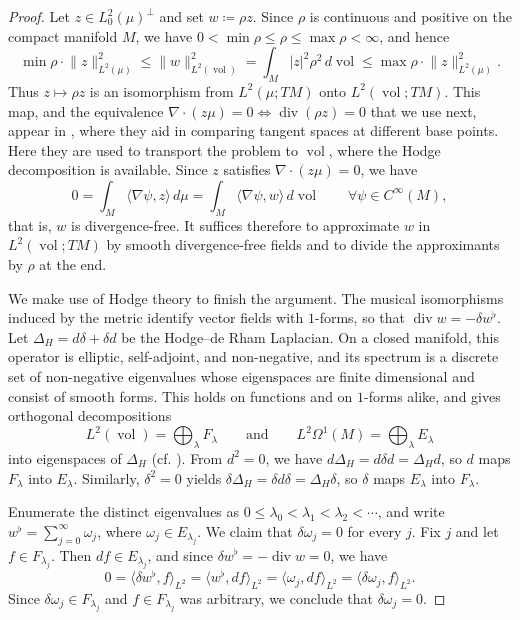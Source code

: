 \documentclass[11pt,reqno]{amsart}
\theoremstyle{plain}
\theoremstyle{definition}
\DeclareMathOperator{\vol}{vol}
\DeclareMathOperator{\Div}{div}
\begin{document}
\begin{proof}
    Let \( z\in L^2_0(\mu)^\perp \) and set \( w\coloneqq\rho z \).
    Since \( \rho \) is continuous and positive on the compact manifold \( M \), we have \( 0<\min\rho\le\rho\le\max\rho<\infty \), and hence
    \[
        \min\rho\cdot\lVert z\rVert^2_{L^2(\mu)} \le \lVert w\rVert^2_{L^2(\vol)} =\int_M\lvert z\rvert^2\rho^2\,d\vol \le \max\rho\cdot\lVert z\rVert^2_{L^2(\mu)}.
    \]
    Thus \( z\mapsto\rho z \) is an isomorphism from \( L^2(\mu;TM) \) onto \( L^2(\vol;TM) \).
    This map, and the equivalence \( \nabla\!\cdot(z\mu)=0\iff\Div(\rho z)=0 \) that we use next, appear in \cite[\S3]{gomes_differential_2024}, where they aid in comparing tangent spaces at different base points.
    Here they are used to transport the problem to \( \vol \), where the Hodge decomposition is available.
    Since \( z \) satisfies \( \nabla\!\cdot(z\mu)=0 \), we have
    \[
        0
        =\int_M\langle\nabla\psi,z\rangle\,d\mu =\int_M\langle\nabla\psi,w\rangle\,d\vol \qquad\forall\psi\in C^\infty(M),
    \]
    that is, \( w \) is divergence-free.
    It suffices therefore to approximate \( w \) in \( L^2(\vol;TM) \) by smooth divergence-free fields and to divide the approximants by \( \rho \) at the end.

    We make use of Hodge theory to finish the argument.
    The musical isomorphisms induced by the metric identify vector fields with \( 1 \)-forms, so that \( \Div w=-\delta w^\flat \).
    Let \( \Delta_H=d\delta+\delta d \) be the Hodge--de Rham Laplacian.
    On a closed manifold, this operator is elliptic, self-adjoint, and non-negative, and its spectrum is a discrete set of non-negative eigenvalues whose eigenspaces are finite dimensional and consist of smooth forms.
    This holds on functions and on \( 1 \)-forms alike, and gives orthogonal decompositions
    \[
        L^2(\vol)=\bigoplus_\lambda F_\lambda \qquad\text{and}\qquad L^2\Omega^1(M)=\bigoplus_\lambda E_\lambda
    \]
    into eigenspaces of \( \Delta_H \) (cf. \cite[Chapter 6]{warner_foundations_1983}).
    From \( d^2=0 \), we have \( d\Delta_H=d\delta d=\Delta_Hd \), so \( d \) maps \( F_\lambda \) into \( E_\lambda \).
    Similarly, \( \delta^2=0 \) yields \( \delta\Delta_H=\delta d\delta=\Delta_H\delta \), so \( \delta \) maps \( E_\lambda \) into \( F_\lambda \).

    Enumerate the distinct eigenvalues as \( 0\le\lambda_0<\lambda_1<\lambda_2<\cdots \), and write \( w^\flat=\sum_{j=0}^\infty\omega_j \), where \( \omega_j\in E_{\lambda_j} \).
    We claim that \( \delta\omega_j=0 \) for every \( j \).
    Fix \( j \) and let \( f\in F_{\lambda_j} \).
    Then \( df\in E_{\lambda_j} \), and since \(\delta w^\flat = -\Div w = 0\), we have
    \[
        0=\langle\delta w^\flat,f\rangle_{L^2}=\langle w^\flat,df\rangle_{L^2}=\langle\omega_j,df\rangle_{L^2}=\langle\delta\omega_j,f\rangle_{L^2}.
    \]
    Since \( \delta\omega_j\in F_{\lambda_j} \) and \( f\in F_{\lambda_j} \) was arbitrary, we conclude that \( \delta\omega_j=0 \).


\end{proof}
\end{document}
